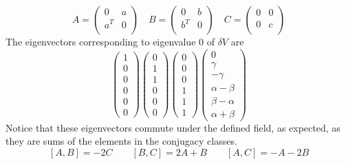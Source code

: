 \documentclass[12pt]{article}
\begin{document}
\begin{equation}
A = \left( \begin{array}{cc} 0 & a \\ a^T & 0 \\ \end{array} \right) \quad
B = \left( \begin{array}{cc} 0 & b \\ b^T & 0 \\ \end{array} \right) \quad
C = \left( \begin{array}{cc} 0 & 0 \\ 0 & c \\ \end{array} \right)
\end{equation}
 The eigenvectors corresponding to eigenvalue 0 of $\delta V$ are
\begin{displaymath}
\left( \begin{array}{c} 1 \\ 0 \\ 0 \\ 0 \\ 0 \\ 0 \end{array}\right)
\left( \begin{array}{c} 0 \\ 1 \\ 1 \\ 0 \\ 0 \\ 0 \end{array}\right)
\left( \begin{array}{c} 0 \\ 0 \\ 0 \\ 1 \\ 1 \\ 1 \end{array}\right)
\left( \begin{array}{c} 0 \\ \gamma \\ -\gamma \\ \alpha-\beta \\ \beta-\alpha \\ \alpha+\beta \end{array}\right)
\end{displaymath}
 Notice that these eigenvectors commute under the defined field, as expected,
as they are sums of the elements in the conjugacy classes.
$$
\left[ A,B \right] = -2C \quad \quad
\left[ B,C \right] = 2A + B \quad \quad
\left[ A,C \right] = -A - 2B
$$
\end{document}
